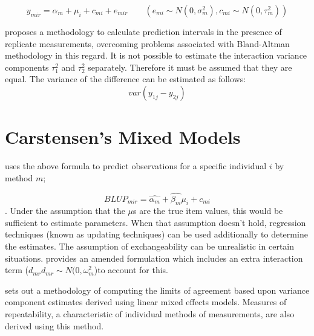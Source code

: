 \documentclass[12pt, a4paper]{report}
\theoremstyle{plain}
\theoremstyle{definition}
\theoremstyle{remark}
\begin{document}
\begin{equation}
y_{mir}  = \alpha_{m} + \mu_{i} + c_{mi} + e_{mir} \qquad ( e_{mi}
\sim N(0,\sigma^{2}_{m}), c_{mi} \sim N(0,\tau^{2}_{m}))
\end{equation}

\citet{BXC2008} proposes a methodology to calculate prediction
intervals in the presence of replicate measurements, overcoming
problems associated with Bland-Altman methodology in this regard.
It is not possible to estimate the interaction variance components
$\tau^{2}_{1}$ and $\tau^{2}_{2}$ separately. Therefore it must be
assumed that they are equal. The variance of the difference can be
estimated as follows:
\begin{equation}
var(y_{1j}-y_{2j})
\end{equation}

\newpage
\section{Carstensen's Mixed Models}


\citet{BXC2004} uses the above formula to predict observations for
a specific individual $i$ by method $m$;

\begin{equation}BLUP_{mir} = \hat{\alpha_{m}} + \hat{\beta_{m}}\mu_{i} +
c_{mi} \end{equation}. Under the assumption that the $\mu$s are
the true item values, this would be sufficient to estimate
parameters. When that assumption doesn't hold, regression techniques (known as updating techniques)
can be used additionally to determine the estimates.
The assumption of exchangeability can be unrealistic in certain situations.
\citet{BXC2004} provides an amended formulation which includes an extra interaction
term ($d_{mr} d_{mr} \sim N(0,\omega^{2}_{m}$)to account for this.

\citet{BXC2008} sets out a methodology of computing the limits of
agreement based upon variance component estimates derived using
linear mixed effects models. Measures of repeatability, a
characteristic of individual methods of measurements, are also
derived using this method.




\end{document}

